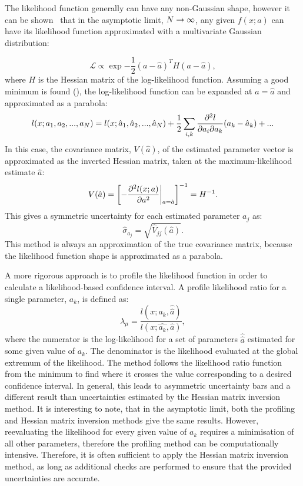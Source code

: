 The likelihood function generally can have any non-Gaussian shape, however it can be shown~\cite{James_2006} that in the asymptotic limit, $N\rightarrow\infty$, 
any given $f(x;a)$ can have its likelihood function approximated with a multivariate Gaussian distribution:

\begin{equation}
    \mathcal{L} \propto \exp{-\frac{1}{2}(a-\hat{a})^T H(a-\hat{a})},
\end{equation}
where $H$ is the Hessian matrix of the log-likelihood function. Assuming a good minimum is found (), the log-likelihood function can be expanded at $a=\hat{a}$ and approximated as a parabola:
\begin{equation}
    l(x;a_1,a_2,...,a_N) = l(x;\hat{a}_1,\hat{a}_2,...,\hat{a}_N) + \frac{1}{2}\sum_{i,k} \pdv{l}{a_i}{a_k} (a_i-\hat{a}_i)(a_k-\hat{a}_k)+...
\end{equation}
In this case, the covariance matrix, $V(\hat{a})$, of the estimated parameter vector is approximated as the inverted Hessian matrix, taken at the maximum-likelihood estimate $\hat{a}$:
\begin{equation}
    V(\hat{a}) = \left[-\pdv[2]{l(x;a)}{a}\middle|^{}_{\ds a=\hat{a}}\right]^{-1} = H^{-1}.
\end{equation}
This gives a symmetric uncertainty for each estimated parameter $a_j$ as:
\begin{equation}
    \hat{\sigma}_{a_j} = \sqrt{\hat{V}_{jj}(\hat{a})}.
\end{equation}
This method is always an approximation of the true covariance matrix, because the likelihood function shape is approximated as a parabola.

A more rigorous approach is to profile the likelihood function in order to calculate a likelihood-based confidence interval.
A profile likelihood ratio for a single parameter, $a_k$, is defined as:
\begin{equation}
    \lambda_{\mu} = \frac{l(x;a_k,\hat{\hat{a}})}{l(x;\hat{a_k},\hat{a})},
\end{equation} 
where the numerator is the log-likelihood for a set of parameters $\hat{\hat{a}}$ estimated for some given value of $a_k$. 
The denominator is the likelihood evaluated at the global extremum of the likelihood. 
The method follows the likelihood ratio function from the minimum to find where it crosses the value corresponding to a desired confidence interval.
In general, this leads to asymmetric uncertainty bars and a different result than uncertainties estimated by the Hessian matrix inversion method.
It is interesting to note, that in the asymptotic limit, both the profiling and Hessian matrix inversion methods give the same results.
However, reevaluating the likelihood for every given value of $a_k$ requires a minimisation of all other parameters, therefore the profiling method can be computationally intensive. 
Therefore, it is often sufficient to apply the Hessian matrix inversion method, as long as additional checks are performed to ensure that the provided uncertainties are accurate.

